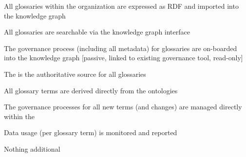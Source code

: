 \kgmmscoringlevelThree

\begin{scoring}

  \item All glossaries within the organization are expressed as RDF and imported into the knowledge graph
  \item All glossaries are searchable via the knowledge graph interface
  \item The governance process (including all metadata) for glossaries are on-boarded into the knowledge graph
        [passive, linked to existing governance tool, read-only]

\end{scoring}

\kgmmscoringlevelFour

\begin{scoring}

  \item The  is the authoritative source for all glossaries
  \item All glossary terms are derived directly from the ontologies
  \item The governance processes for all new terms (and changes) are managed directly within the 
  \item Data usage (per glossary term) is monitored and reported

\end{scoring}

\kgmmscoringlevelFive

Nothing additional

